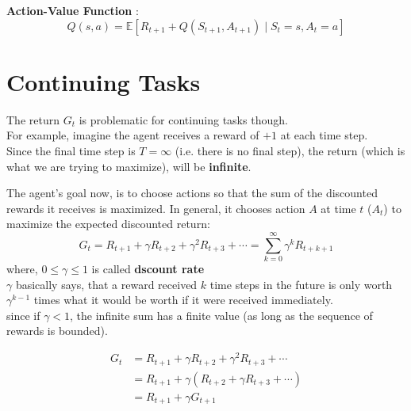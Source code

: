 \textbf{Action-Value Function} \cite{medium-Kaushik_Dayalan/bellman-equation-value-functions-reinforcement-learning-b8a0a1cad84f}:
\[
    Q(s,a) = \mathbb{E}[R_{t+1} + Q(S_{t+1}, A_{t+1}) \mid S_t=s, A_t=a]
\]


\section{Continuing Tasks \cite{medium-introduction-to-reinforcement-learning-rl-part-3-finite-markov-decision-processes-51e1f8d3ddb7}}

The return $G_t$ is problematic for continuing tasks though.\\
For example, imagine the agent receives a reward of $+1$ at each time step.\\
Since the final time step is $T = \infty$ (i.e. there is no final step), the return (which is what we are trying to maximize), will be \textbf{infinite}.

The agent’s goal now, is to choose actions so that the sum of the discounted rewards it receives is maximized.
In general, it chooses action $A$ at time $t$ ($A_t$) to maximize the expected discounted return:
\[
    G_t = R_{t+1} + \gamma R_{t+2} + \gamma^2 R_{t+3} + \cdots = \sum_{k=0}^{\infty} \gamma^k R_{t+k+1}
\]
where, $0 \leq \gamma \leq 1$ is called \textbf{dscount rate}\\
$\gamma$ basically says, that a reward received $k$ time steps in the future is only worth $\gamma^{k-1}$ times what it would be worth if it were received immediately.\\
since if $\gamma < 1$, the infinite sum has a finite value (as long as the sequence of rewards is bounded).

\begin{align*}
    G_t &= R_{t+1} + \gamma R_{t+2} + \gamma^2 R_{t+3} + \cdots \\
    &= R_{t+1} + \gamma (R_{t+2} + \gamma R_{t+3} + \cdots)\\
    &= R_{t+1} + \gamma G_{t+1}
\end{align*}

